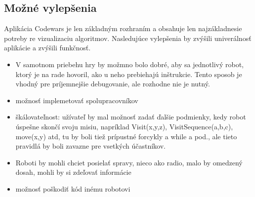 \subsection{Možné vylepšenia}
Aplikácia Codewars je len základným rozhraním a obsahuje len najzákladnesie potreby re vizualizaciu algoritmov. Nasledujúce vylepšenia by zvýšili univerálnosť aplikácie a zvýšili funkčnosť.\\
\begin{itemize}
\item V samotnom priebehu hry by možmno bolo dobré, aby sa jednotlivý robot, ktorý je na rade hovoril, ako u neho prebiehajú inštrukcie. Tento sposob je vhodný pre príjemnejšie debugovanie, ale rozhodne nie je nutný.
\item možnosť implemetovať spolupracovníkov
\item škálovateľnost: užívateľ by mal možnosť zadať ďalšie podmienky, kedy robot úspešne skončí svoju misiu, napríklad Visit(x,y,z), VisitSequence(a,b,c), move(x,y) atd, tu by boli tiež prípustné forcykly  a while a pod., ale tieto pravidlá by boli zavazne pre vsetkých účastníkov.
\item Roboti by mohli chciet posielať spravy, nieco ako radio, malo by omedzený dosah, mohli by si zdeľovať informácie 
\item možnosť poškodiť kód inému robotovi
\end{itemize}
%


%

